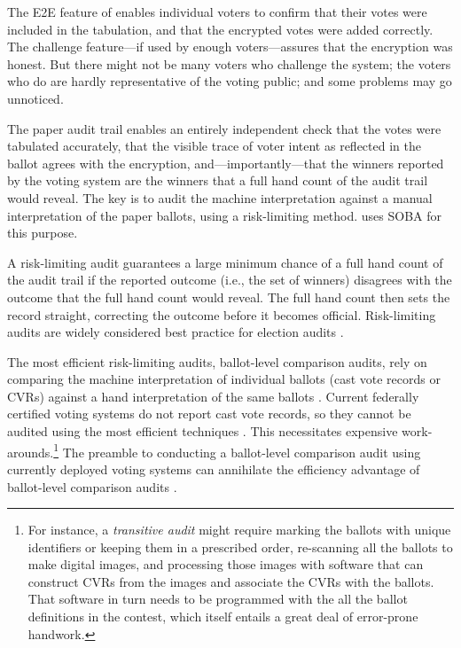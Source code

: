 \label{sec:audit}

The E2E feature of \projname enables individual voters to confirm that their votes were included in the
tabulation, and that the encrypted votes were added correctly.
The challenge feature---if used by enough voters---assures that the encryption was honest.
But there might not be many voters who challenge the system; the voters who do are hardly
representative of the voting public; and some problems may go unnoticed.

The paper audit trail enables an entirely independent check that the votes were tabulated accurately, that
the visible trace of voter intent as reflected in the ballot agrees with the encryption, and---importantly---that
the winners reported by the voting system are the winners that a full hand count of the audit trail would
reveal.
The key is to audit the machine interpretation against a manual interpretation of the paper ballots,
using a risk-limiting method.
\projname uses SOBA \cite{benalohEtal11} for this purpose.

A risk-limiting audit guarantees a large minimum chance of a full hand count of the audit trail if the
reported outcome (i.e., the set of winners) disagrees with the outcome that the full hand count would reveal.
The full hand count then sets the record straight, correcting the outcome before it becomes official.
Risk-limiting audits are widely considered best practice for election audits \cite{bestPractices08}.

The most efficient risk-limiting audits, ballot-level comparison audits, rely on comparing 
the machine interpretation of individual ballots
(cast vote records or CVRs) 
against a hand interpretation of the same ballots \cite{stark10d,benalohEtal11,lindemanStark12}.
Current federally certified voting systems do not report cast vote records, so they cannot
be audited using the most efficient techniques \cite{lindemanStark12,wagnerStark12}.
This necessitates expensive work-arounds.\footnote{%
    For instance, a {\em transitive audit\/} might require marking the ballots with unique identifiers
    or keeping them in a prescribed order, re-scanning all the ballots to make digital images,
    and processing those images with software that can construct CVRs from the images and
   associate the CVRs with the ballots.
   That software in turn needs to be programmed with the all the ballot definitions in the contest,
    which itself entails a great deal of error-prone handwork.
}
The preamble to conducting a ballot-level comparison audit using currently deployed voting systems
can annihilate the efficiency advantage of ballot-level comparison audits \cite{wagnerStark12}.

